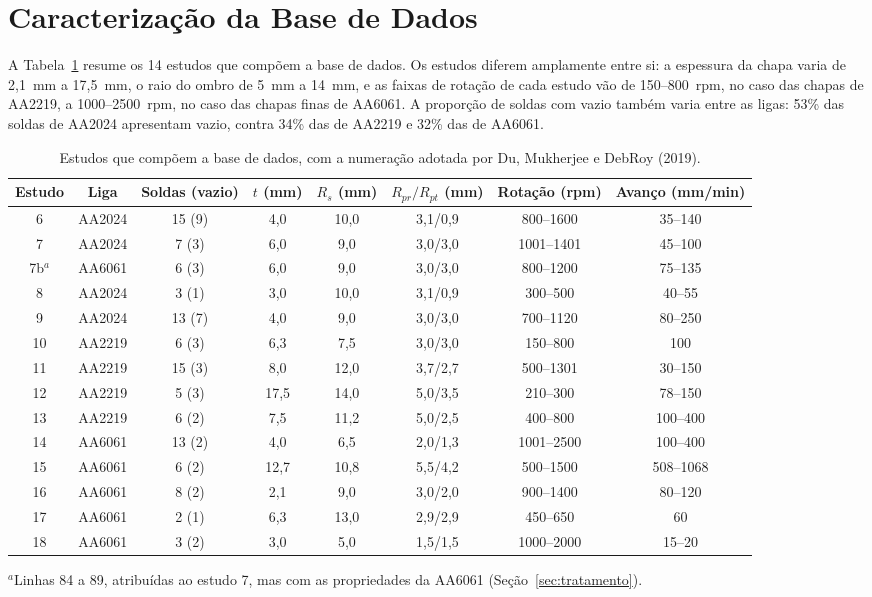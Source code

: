 \documentclass[12pt,openany]{report}
\begin{document}
\section{Caracterização da Base de Dados}
\label{sec:caracterizacao}

A Tabela~\ref{tab:estudos} resume os 14 estudos que compõem a base de dados. Os estudos diferem amplamente entre si: a espessura da chapa varia de 2,1~mm a 17,5~mm, o raio do ombro de 5~mm a 14~mm, e as faixas de rotação de cada estudo vão de 150--800~rpm, no caso das chapas de AA2219, a 1000--2500~rpm, no caso das chapas finas de AA6061. A proporção de soldas com vazio também varia entre as ligas: 53\% das soldas de AA2024 apresentam vazio, contra 34\% das de AA2219 e 32\% das de AA6061.

\begin{table}[htbp]
\centering
\caption{Estudos que compõem a base de dados, com a numeração adotada por Du, Mukherjee e DebRoy (2019).}
\label{tab:estudos}
\footnotesize
\setlength{\tabcolsep}{3.5pt}
\begin{tabular}{cccccccc}
\toprule
\textbf{Estudo} & \textbf{Liga} & \textbf{Soldas (vazio)} & \textbf{$t$ (mm)} & \textbf{$R_s$ (mm)} & \textbf{$R_{pr}/R_{pt}$ (mm)} & \textbf{Rotação (rpm)} & \textbf{Avanço (mm/min)} \\ \midrule
6 & AA2024 & 15 (9) & 4,0 & 10,0 & 3,1/0,9 & 800--1600 & 35--140 \\
7 & AA2024 & 7 (3) & 6,0 & 9,0 & 3,0/3,0 & 1001--1401 & 45--100 \\
7b$^{a}$ & AA6061 & 6 (3) & 6,0 & 9,0 & 3,0/3,0 & 800--1200 & 75--135 \\
8 & AA2024 & 3 (1) & 3,0 & 10,0 & 3,1/0,9 & 300--500 & 40--55 \\
9 & AA2024 & 13 (7) & 4,0 & 9,0 & 3,0/3,0 & 700--1120 & 80--250 \\
10 & AA2219 & 6 (3) & 6,3 & 7,5 & 3,0/3,0 & 150--800 & 100 \\
11 & AA2219 & 15 (3) & 8,0 & 12,0 & 3,7/2,7 & 500--1301 & 30--150 \\
12 & AA2219 & 5 (3) & 17,5 & 14,0 & 5,0/3,5 & 210--300 & 78--150 \\
13 & AA2219 & 6 (2) & 7,5 & 11,2 & 5,0/2,5 & 400--800 & 100--400 \\
14 & AA6061 & 13 (2) & 4,0 & 6,5 & 2,0/1,3 & 1001--2500 & 100--400 \\
15 & AA6061 & 6 (2) & 12,7 & 10,8 & 5,5/4,2 & 500--1500 & 508--1068 \\
16 & AA6061 & 8 (2) & 2,1 & 9,0 & 3,0/2,0 & 900--1400 & 80--120 \\
17 & AA6061 & 2 (1) & 6,3 & 13,0 & 2,9/2,9 & 450--650 & 60 \\
18 & AA6061 & 3 (2) & 3,0 & 5,0 & 1,5/1,5 & 1000--2000 & 15--20 \\ \bottomrule
\end{tabular}

\vspace{0.1cm}
\raggedright\footnotesize $^{a}$Linhas 84 a 89, atribuídas ao estudo 7, mas com as propriedades da AA6061 (Seção~\ref{sec:tratamento}).
\end{table}
\end{document}

